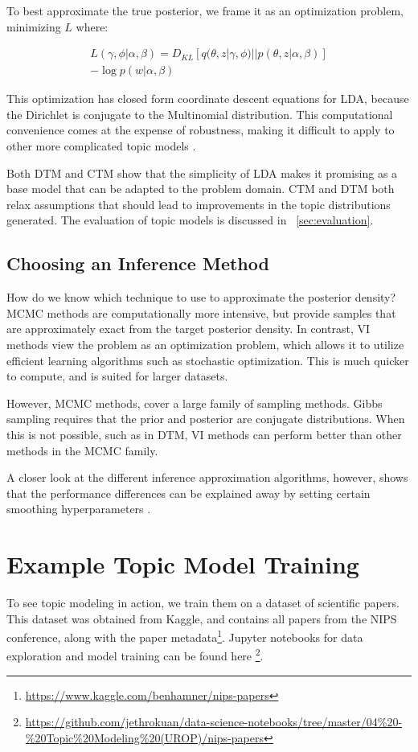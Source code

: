 \documentclass[letterpaper]{article}
\begin{document}
To best approximate the true posterior, we frame it as an optimization
problem, minimizing $L$ where:

\begin{multline}
L(\gamma, \phi | \alpha, \beta) = D_{KL}\left[ q(\theta, z | \gamma,
  \phi) || p(\theta, z | \alpha, \beta) \right] \\
- \log p(w | \alpha, \beta)
\end{multline}

This optimization has closed form coordinate descent equations for
LDA, because the Dirichlet is conjugate to the Multinomial
distribution. This computational convenience comes at the expense of
robustness, making it difficult to apply to other more complicated
topic models \cite{blei2003latent}.

Both DTM and CTM show that the simplicity of LDA makes it promising as
a base model that can be adapted to the problem domain. CTM and DTM both
relax assumptions that should lead to improvements in the topic
distributions generated. The evaluation of topic models is discussed
in ~\autoref{sec:evaluation}.

\subsection{Choosing an Inference Method}
\label{sub:choosing-inference}
How do we know which technique to use to approximate the posterior
density? MCMC methods are computationally more intensive, but provide
samples that are approximately exact from the target posterior
density. In contrast, VI methods view the problem as an optimization
problem, which allows it to utilize efficient learning algorithms such
as stochastic optimization. This is much quicker to compute, and is
suited for larger datasets.

However, MCMC methods, cover a large family of sampling methods.
Gibbs sampling requires that the prior and posterior are conjugate
distributions. When this is not possible, such as in DTM, VI methods
can perform better than other methods in the MCMC family.

A closer look at the different inference approximation algorithms,
however, shows that the performance differences can be explained away
by setting certain smoothing hyperparameters
\cite{asuncion-2012-smoot-infer}.

\section{Example Topic Model Training}
To see topic modeling in action, we train them on a dataset of
scientific papers. This dataset was obtained from Kaggle, and contains
all papers from the NIPS conference, along with the paper
metadata\footnote{\url{https://www.kaggle.com/benhamner/nips-papers}}.
Jupyter notebooks for data exploration and model training can be found
here
\footnote{\url{https://github.com/jethrokuan/data-science-notebooks/tree/master/04\%20-\%20Topic\%20Modeling\%20(UROP)/nips-papers}}.
\end{document}
